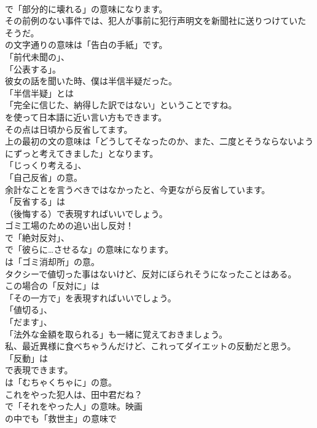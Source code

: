\documentclass[8pt]{extreport}
\begin{document}
\begin{CJK}{UTF8}{min}
\\	で「部分的に壊れる」の意味になります。	
\\	その前例のない事件では、犯人が事前に犯行声明文を新聞社に送りつけていたそうだ。 
\\	の文字通りの意味は「告白の手紙」です。
\\	「前代未聞の」、
\\	「公表する」。	
\\	彼女の話を聞いた時、僕は半信半疑だった。 
\\	「半信半疑」とは
\\	「完全に信じた、納得した訳ではない」ということですね。
\\	を使って日本語に近い言い方もできます。	
\\	その点は日頃から反省してます。 
\\	上の最初の文の意味は「どうしてそなったのか、また、二度とそうならないようにずっと考えてきました」となります。
\\	「じっくり考える」、
\\	「自己反省」の意。	
\\	余計なことを言うべきではなかったと、今更ながら反省しています。 
\\	「反省する」は 
\\	（後悔する）で表現すればいいでしょう。	
\\	ゴミ工場のための追い出し反対！ 
\\	で「絶対反対」、
\\	で「彼らに…させるな」の意味になります。
\\	は「ゴミ消却所」の意。	
\\	タクシーで値切った事はないけど、反対にぼられそうになったことはある。 
\\	この場合の「反対に」は
\\	「その一方で」を表現すればいいでしょう。
\\	「値切る」、
\\	「だます」、
\\	「法外な金額を取られる」も一緒に覚えておきましょう。	
\\	私、最近異様に食べちゃうんだけど、これってダイエットの反動だと思う。 
\\	「反動」は 
\\	で表現できます。
\\	は「むちゃくちゃに」の意。	
\\	これをやった犯人は、田中君だね？ 
\\	で「それをやった人」の意味。映画
\\	の中でも「救世主」の意味で

\end{CJK}
\end{document}
